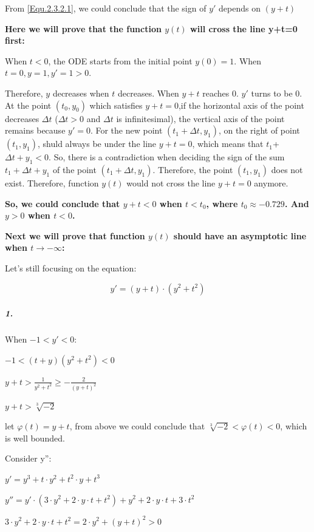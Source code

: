\documentclass[11pt,a4paper]{article}
\begin{document}
	From \ref{Equ.2.3.2.1}, we could conclude that the sign of $y'$ depends on $(y+t)$
	
	\textbf{Here we will prove that the function $y(t)$ will cross the line y+t=0 first:}
	
	When $t<0$, the ODE starts from the initial point $y(0)=1$. When $t=0, y=1, y'=1>0$.
	
	Therefore, $y$ decreases when $t$ decreases. When $y+t$ reaches 0. $y'$ turns to be 0. At the point $(t_0, y_0)$ which satisfies $y+t=0$,if the horizontal axis of the point decreases $\Delta t$ ($\Delta t>0$ and $\Delta t$ is infinitesimal), the vertical axis of the point remains because $y' = 0$. For the new point $(t_1+ \Delta t, y_1)$, on the right of point $(t_1, y_1)$, shuld always be under the line $y+t=0$, which means that $t_1$+$\Delta t + y_1 < 0$. So, there is a contradiction when deciding the sign of the sum $t_1+\Delta t+y_1$ of the point $(t_1+\Delta t, y_1)$. Therefore, the point $(t_1, y_1)$ does not exist. Therefore, function $y(t)$ would not cross the line $y+t=0$ anymore.
	
	\textbf{So, we could conclude that $y+t<0$ when $t<t_0$, where $t_0 \approx -0.729$. And $y>0$ when $t<0$.}
	
	\textbf{Next we will prove that function $y(t)$ should have an asymptotic line when $t \rightarrow -\infty$:}
	
	Let's still focusing on the equation:
	
	\begin{equation}
		y'=(y+t)\cdot(y^2+t^2) \label{Equ 2.3.2.1}
	\end{equation}
	
	\subparagraph{1.} When $-1<y'<0:$
	
	\begin{center}
		$-1<(t+y)(y^2+t^2)<0$
		
		$y+t>\frac{1}{y^2+t^2}\geq -\frac{2}{(y+t)^2}$
		
		$y+t>\sqrt[3]{-2}$
		
	\end{center}
	let $\varphi(t)=y+t$, from above we could conclude that $\sqrt[3]{-2} < \varphi(t)<0$, which is well bounded.
	
	Consider y'':
	
	\begin{center}
		$y' = y^3+t\cdot y^2+t^2\cdot y+t^3$
		
		$y''=y'\cdot (3\cdot y^2+2\cdot y\cdot t+t^2)+y^2+2\cdot y\cdot t + 3\cdot t^2$
		
		$3\cdot y^2+2\cdot y \cdot t + t^2=2\cdot y^2+(y+t)^2>0$
	\end{center}
\end{document}
